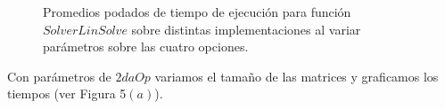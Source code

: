  \begin{figure}[htbp]
\centering


\caption{Promedios podados de tiempo de ejecución para función $Solver Lin Solve$ sobre distintas implementaciones al variar parámetros sobre las cuatro opciones.} \label{fig:lego}
\end{figure}

Con parámetros de $2daOp$ variamos el tamaño de las matrices y graficamos los tiempos (ver Figura 5$(a)$).
  

